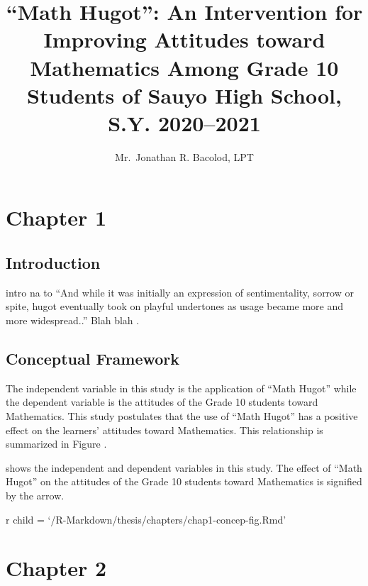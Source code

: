 \documentclass[
  man, donotrepeattitle]{apa6}
\affiliation {Sauyo High School}
\title{``Math Hugot'': An Intervention for Improving Attitudes toward
Mathematics Among Grade 10 Students of Sauyo High School, S.Y.
2020--2021}
\author{Mr.~Jonathan R. Bacolod, LPT}
\date{}
\begin{document}
\maketitle

\newpage

\newpage
\tableofcontents

\newpage
\listoftables

\newpage
\listoffigures

\newpage

\hypertarget{chapter-1}{%
\section{Chapter 1}\label{chapter-1}}

\hypertarget{introduction}{%
\subsection{Introduction}\label{introduction}}

intro na to ``And while it was initially an expression of
sentimentality, sorrow or spite, hugot eventually took on playful
undertones as usage became more and more widespread..'' Blah blah
\autocite{alk13}.

\hypertarget{conceptual-framework}{%
\subsection{Conceptual Framework}\label{conceptual-framework}}

The independent variable in this study is the application of ``Math
Hugot'' while the dependent variable is the attitudes of the Grade 10
students toward Mathematics. This study postulates that the use of
``Math Hugot'' has a positive effect on the learners' attitudes toward
Mathematics. This relationship is summarized in Figure .

shows the independent and dependent variables in this study. The effect
of ``Math Hugot'' on the attitudes of the Grade 10 students toward
Mathematics is signified by the arrow.

r child = `/R-Markdown/thesis/chapters/chap1-concep-fig.Rmd'

\newpage

\hypertarget{chapter-2}{%
\section{Chapter 2}\label{chapter-2}}
\end{document}
